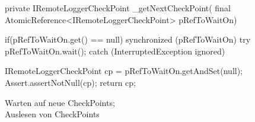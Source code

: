 \begin{wrapfigure}[17]{r}[0cm]{0.59\textwidth}
    \centering
    \vspace{-12px}
	\begin{spacing}{0.75}
		\begin{javacode}[firstnumber=89]
 private IRemoteLoggerCheckPoint _getNextCheckPoint(
   final AtomicReference<IRemoteLoggerCheckPoint> 
   pRefToWaitOn)
 {
  if(pRefToWaitOn.get() == null)
  {
    synchronized (pRefToWaitOn)
    {
      try
      {
        pRefToWaitOn.wait();
      }
      catch (InterruptedException ignored)
      {
      }
    }
  }

  IRemoteLoggerCheckPoint cp = 
    pRefToWaitOn.getAndSet(null);
  Assert.assertNotNull(cp);
  return cp;
}\end{javacode}
	\end{spacing}
	\caption{Warten auf neue CheckPoints; \\ Auslesen von CheckPoints}
	\label{fig:CODE_TestRemoteLogger-getNextCheckPoint}
\end{wrapfigure}
